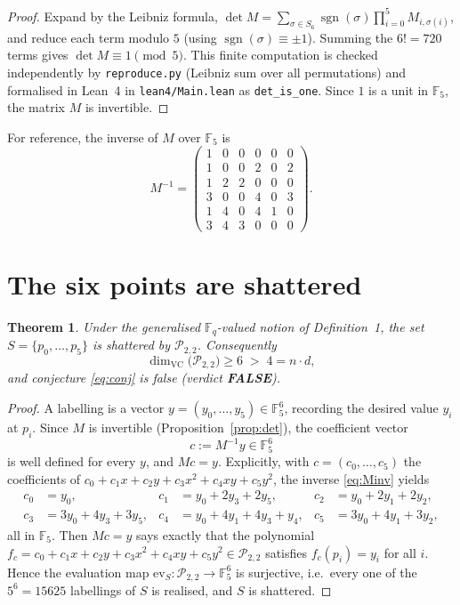 \documentclass[11pt]{article}
\newtheorem{theorem}{Theorem}
\newcommand{\F}{\mathbb{F}}
\begin{document}
\begin{proof}
Expand by the Leibniz formula, $\det M=\sum_{\sigma\in S_6}
\operatorname{sgn}(\sigma)\prod_{i=0}^{5}M_{i,\sigma(i)}$, and reduce each term
modulo $5$ (using $\operatorname{sgn}(\sigma)\equiv \pm 1$). Summing the $6!=720$
terms gives $\det M \equiv 1 \pmod 5$. This finite computation is checked
independently by \texttt{reproduce.py} (Leibniz sum over all permutations) and
formalised in Lean~4 in \texttt{lean4/Main.lean} as
\texttt{det\_is\_one}. Since $1$ is a unit in $\F_5$, the matrix $M$ is
invertible.
\end{proof}

For reference, the inverse of $M$ over $\F_5$ is
\begin{equation}\label{eq:Minv}
  M^{-1}=\begin{pmatrix}
    1&0&0&0&0&0\\
    1&0&0&2&0&2\\
    1&2&2&0&0&0\\
    3&0&0&4&0&3\\
    1&4&0&4&1&0\\
    3&4&3&0&0&0
  \end{pmatrix}.
\end{equation}

\section{The six points are shattered}

\begin{theorem}\label{thm:shatter}
  Under the generalised $\F_q$-valued notion of Definition~1, the set
  $S=\{p_0,\dots,p_5\}$ is shattered by $\mathcal{P}_{2,2}$. Consequently
  \[
    \dim_{\mathrm{VC}}\bigl(\mathcal{P}_{2,2}\bigr)\ge 6 \;>\; 4 = n\cdot d ,
  \]
  and conjecture \eqref{eq:conj} is false (verdict \textbf{FALSE}).
\end{theorem}

\begin{proof}
A labelling is a vector $y=(y_0,\dots,y_5)\in\F_5^{6}$, recording the desired
value $y_i$ at $p_i$. Since $M$ is invertible (Proposition~\ref{prop:det}),
the coefficient vector
\[
  c := M^{-1}y \in \F_5^{6}
\]
is well defined for every $y$, and $M c = y$. Explicitly, with
$c=(c_0,\dots,c_5)$ the coefficients of
$c_0+c_1x+c_2y+c_3x^2+c_4xy+c_5y^2$, the inverse \eqref{eq:Minv} yields
\[
  \begin{aligned}
    c_0&=y_0, & c_1&=y_0+2y_3+2y_5, & c_2&=y_0+2y_1+2y_2,\\
    c_3&=3y_0+4y_3+3y_5, & c_4&=y_0+4y_1+4y_3+y_4, & c_5&=3y_0+4y_1+3y_2,
  \end{aligned}
\]
all in $\F_5$. Then $M c=y$ says exactly that the polynomial
$f_c=c_0+c_1x+c_2y+c_3x^2+c_4xy+c_5y^2\in\mathcal{P}_{2,2}$ satisfies
$f_c(p_i)=y_i$ for all $i$. Hence the evaluation map
$\mathrm{ev}_S\colon\mathcal{P}_{2,2}\to\F_5^{6}$ is surjective, i.e.\ every
one of the $5^{6}=15625$ labellings of $S$ is realised, and $S$ is shattered.
\end{proof}
\end{document}
